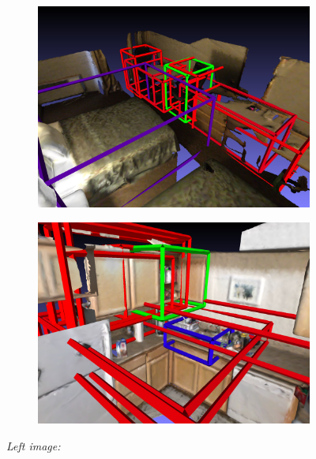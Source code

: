 \documentclass[10pt,twocolumn,letterpaper]{article}
\begin{document}
\begin{figure}
	\centering
	\begin{subfigure}[c]{.49\linewidth}
		\centering
		\includegraphics[width=\linewidth]{figures/gt_scene0221_00_3_0_att_02.png}
		\label{fig:example_1}
	\end{subfigure}
	\begin{subfigure}[c]{.49\linewidth}
		\centering
		\includegraphics[width=\textwidth]{figures/gt_scene0164_00_2_0_att_06.png}
		\label{fig:example_2}
	\end{subfigure}
	\vspace{-1.\baselineskip}
	\begin{flushleft}
		{\scriptsize 
			\textit{Left image:}\\
}
\end{flushleft}
\end{figure}
\end{document}
